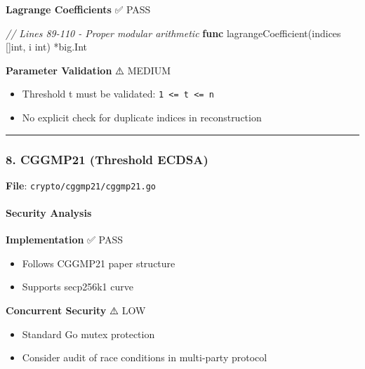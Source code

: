 \documentclass[
]{article}
\newenvironment{Shaded}{}{}
\newcommand{\CommentTok}[1]{\textcolor[rgb]{0.38,0.63,0.69}{\textit{#1}}}
\newcommand{\DataTypeTok}[1]{\textcolor[rgb]{0.56,0.13,0.00}{#1}}
\newcommand{\KeywordTok}[1]{\textcolor[rgb]{0.00,0.44,0.13}{\textbf{#1}}}
\newcommand{\NormalTok}[1]{#1}
\newcommand{\OperatorTok}[1]{\textcolor[rgb]{0.40,0.40,0.40}{#1}}
\providecommand{\tightlist}{%
  \setlength{\itemsep}{0pt}\setlength{\parskip}{0pt}}
\begin{document}
\textbf{Lagrange Coefficients} ✅ PASS

\begin{Shaded}
\begin{Highlighting}[]
\CommentTok{// Lines 89{-}110 {-} Proper modular arithmetic}
\KeywordTok{func}\NormalTok{ lagrangeCoefficient}\OperatorTok{(}\NormalTok{indices }\OperatorTok{[]}\DataTypeTok{int}\OperatorTok{,}\NormalTok{ i }\DataTypeTok{int}\OperatorTok{)} \OperatorTok{*}\NormalTok{big}\OperatorTok{.}\NormalTok{Int}
\end{Highlighting}
\end{Shaded}

\textbf{Parameter Validation} ⚠️ MEDIUM

\begin{itemize}
\tightlist
\item
  Threshold t must be validated:
  \texttt{1\ \textless{}=\ t\ \textless{}=\ n}
\item
  No explicit check for duplicate indices in reconstruction
\end{itemize}

\begin{center}\rule{0.5\linewidth}{0.5pt}\end{center}

\subsubsection{8. CGGMP21 (Threshold
ECDSA)}\label{8-cggmp21-threshold-ecdsa}

\textbf{File}: \texttt{crypto/cggmp21/cggmp21.go}

\paragraph{Security Analysis}\label{security-analysis-6}

\textbf{Implementation} ✅ PASS

\begin{itemize}
\tightlist
\item
  Follows CGGMP21 paper structure
\item
  Supports secp256k1 curve
\end{itemize}

\textbf{Concurrent Security} ⚠️ LOW

\begin{itemize}
\tightlist
\item
  Standard Go mutex protection
\item
  Consider audit of race conditions in multi-party protocol
\end{itemize}
\end{document}
